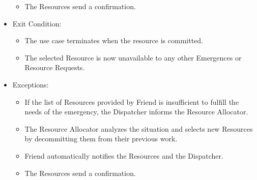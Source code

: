 \begin{examplebox}
\begin{itemize}
\begin{itemize}
            \item The Resources send a confirmation.
        \end{itemize}
        \item Exit Condition:
        \begin{itemize}
            \item The use case terminates when the resource is committed.
            \item The selected Resource is now unavailable to any other Emergences or Resource Requests.
        \end{itemize}
        \item Exceptions:
        \begin{itemize}
            \item If the list of Resources provided by Friend is insufficient to fulfill the needs of the emergency, the Dispatcher informs the Resource Allocator.
            \item The Resource Allocator analyzes the situation and selects new Resources by decommitting them from their previous work.
            \item Friend automatically notifies the Resources and the Dispatcher.
            \item The Resources send a confirmation.
        \end{itemize}
    \end{itemize}
\end{examplebox}
